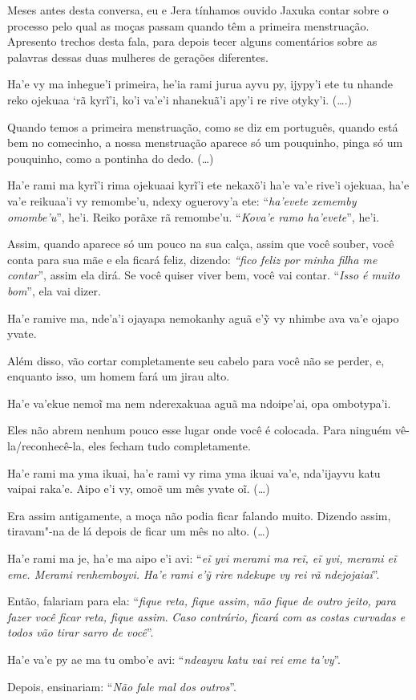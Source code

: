 \indent
Meses antes desta conversa, eu e Jera tínhamos ouvido Jaxuka contar
sobre o processo pelo qual as moças passam quando têm a primeira
menstruação. Apresento trechos desta fala, para depois tecer alguns
comentários sobre as palavras dessas duas mulheres de gerações
diferentes. 

\bigskip

\begin{paracol}{2}
\footnotesize
Ha’e vy ma inhegue’i primeira, he’ia rami jurua ayvu py, ijypy’i ete tu
nhande reko ojekuaa ‘rã kyrĩ’i, ko’i va’e’i nhanekuã’i apy’i re rive
otyky’i. (\ldots{}.)

\switchcolumn
Quando temos a primeira menstruação, como se diz em português, quando
está bem no comecinho, a nossa menstruação aparece só um pouquinho,
pinga só um pouquinho, como a pontinha do dedo. (\ldots{})

\switchcolumn
Ha'e rami ma kyrĩ'i rima ojekuaai kyrĩ'i ete nekaxõ'i ha'e va'e rive'i
ojekuaa, ha'e va'e reikuaa'i vy remombe'u, ndexy oguerovy'a ete:
``\emph{ha'evete xememby omombe'u}'', he'i. Reiko porãxe rã remombe'u.
``\emph{Kova'e ramo ha'evete}'', he'i.

\switchcolumn
Assim, quando aparece só um pouco na sua calça, assim que você souber,
você conta para sua mãe e ela ficará feliz, dizendo: \emph{``fico feliz
por minha filha me contar}'', assim ela dirá. Se você quiser viver bem,
você vai contar. ``\emph{Isso é muito bom}'', ela vai dizer.

\switchcolumn
Ha'e ramive ma, nde'a'i ojayapa nemokanhy aguã e'ỹ vy nhimbe ava va'e
ojapo yvate.

\switchcolumn
Além disso, vão cortar completamente seu cabelo para você não se perder,
e, enquanto isso, um homem fará um jirau alto. 

\switchcolumn
Ha’e va’ekue nemoĩ ma nem nderexakuaa aguã ma ndoipe’ai, opa
ombotypa’i. 

\switchcolumn
Eles não abrem nenhum pouco esse lugar onde você é colocada. Para
ninguém vê-la/reconhecê-la, eles fecham tudo completamente.

\switchcolumn
Ha’e rami ma yma ikuai, ha’e rami vy rima yma ikuai va’e, nda’ijayvu
katu vaipai raka’e.
Aipo e'i vy, omoẽ um mês yvate oĩ. (\ldots{})

\switchcolumn
Era assim antigamente, a moça não podia ficar falando muito. Dizendo
assim, tiravam"-na de lá depois de ficar um mês no alto. (\ldots{})

\switchcolumn
Ha'e rami ma je, ha'e ma aipo e'i avi: ``\emph{eĩ yvi merami ma reĩ, eĩ
yvi, merami eĩ eme. Merami renhemboyvi. Ha'e rami e'ỹ rire ndekupe vy
rei rã ndejojaiai}''. 

\switchcolumn
Então, falariam para ela: ``\emph{fique reta, fique assim, não fique de
outro jeito, para fazer você ficar reta, fique assim}. \emph{Caso
contrário, ficará com as costas curvadas e todos vão tirar sarro de
você}''.

\switchcolumn
Ha'e va'e py ae ma tu ombo'e avi: ``\emph{ndeayvu katu vai rei eme
ta'vy}''.

\switchcolumn
Depois, ensinariam: ``\emph{Não fale mal dos outros}''.
\end{paracol}

